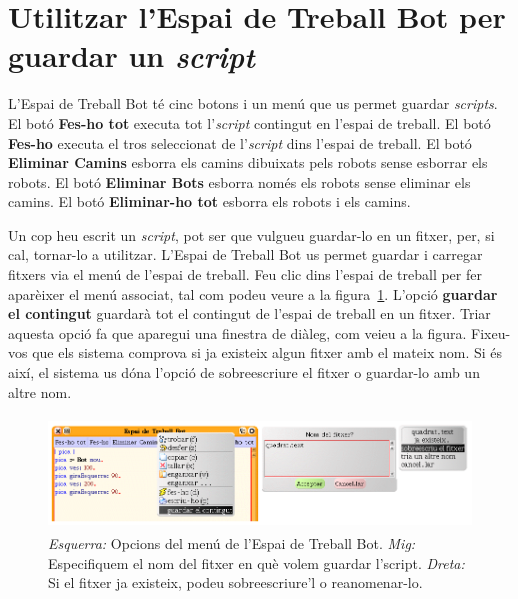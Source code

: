 \section{Utilitzar l'\textsf{Espai de Treball Bot} per guardar un \emph{script}}
L'\textsf{Espai de Treball Bot} té cinc botons i un menú que us permet guardar \emph{scripts}. El botó \textbf{Fes-ho tot} executa tot l'\emph{script} contingut en l'espai de treball. El botó \textbf{Fes-ho} executa el tros seleccionat de l'\emph{script} dins l'espai de treball. El botó \textbf{Eliminar Camins} esborra els camins dibuixats pels robots sense esborrar els robots. El botó \textbf{Eliminar Bots} esborra només els robots sense eliminar els camins. El botó \textbf{Eliminar-ho tot} esborra els robots i els camins.

Un cop heu escrit un \emph{script}, pot ser que vulgueu guardar-lo en un fitxer, per, si cal, tornar-lo a utilitzar. L'\textsf{Espai de Treball Bot} us permet guardar i carregar fitxers via el menú de l'espai de treball. Feu clic dins l'espai de treball per fer aparèixer el menú associat, tal com podeu veure a la figura~\ref{fig0505}. L'opció \textbf{guardar el contingut} guardarà tot el contingut de l'espai de treball en un fitxer.
Triar aquesta opció fa que aparegui una finestra de diàleg, com veieu a la figura. Fixeu-vos que els sistema comprova si ja existeix algun fitxer amb el mateix nom. Si és així, el sistema us dóna l'opció de sobreescriure el fitxer o guardar-lo amb un altre nom. 

\begin{figure}[h]
\begin{center}
\includegraphics[height=30mm ,width=123mm ]{Imatges/figura5-5.png}
\end{center}
\caption{\emph{Esquerra:} Opcions del menú de l'\textsf{\upshape Espai de Treball Bot}.
 	\emph{Mig:} Especifiquem el nom del fitxer en què volem guardar l'script.
	\emph{Dreta:} Si el fitxer ja existeix, podeu sobreescriure'l o reanomenar-lo.}
\label{fig0505}
\end{figure}

